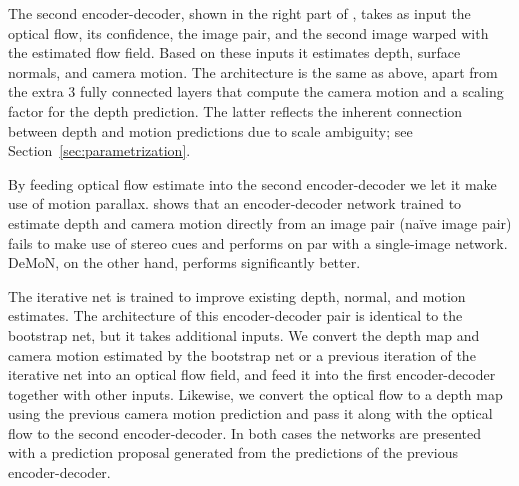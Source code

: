 \documentclass[10pt,twocolumn,letterpaper]{article}
\begin{document}
The second encoder-decoder, shown in the right part of , takes as input the optical flow, its confidence, the image pair, and the 
second image warped with the estimated flow field.
Based on these inputs it estimates depth, surface normals, and camera motion.
The architecture is the same as above, apart from the extra 3 fully connected layers that compute the camera motion and a scaling factor for the depth prediction.
The latter reflects the inherent connection between depth and motion predictions due to scale ambiguity; see Section~\ref{sec:parametrization}. 

\begin{table}
  \begin{center}
  \end{center}
  \vspace{0.4em}%
  \vspace{\capvspace}%
  \caption{%
Na{\"i}ve two-frame depth estimation does not perform better than depth from a single image on any of the error measures (smaller is better). 
The architecture of DeMoN forces the network to use both images, yielding a large performance improvement. 
}
  \label{tbl:ablation_naive_two_frame}
  \vspace{\figvspace}
  \vspace{-0.2em}
\end{table}

By feeding optical flow estimate into the second encoder-decoder we let it make use of motion parallax.
 shows that an encoder-decoder network trained to estimate depth and camera motion  directly from an image pair (na{\"i}ve image pair) fails to make use of stereo cues and performs on par with a single-image network.  
DeMoN, on the other hand, performs significantly better.


The iterative net is trained to improve existing depth, normal, and motion estimates.
The architecture of this encoder-decoder pair is identical to the bootstrap net, but it takes additional inputs. 
We convert the depth map and camera motion estimated by the bootstrap net or a previous iteration of the iterative net into an optical flow field, and feed it into the first encoder-decoder together with other inputs.
Likewise, we convert the optical flow to a depth map using the previous camera motion prediction and pass it along with the optical flow to the second encoder-decoder.
In both cases the networks are presented with a prediction proposal generated from the predictions of the previous encoder-decoder.
\end{document}

